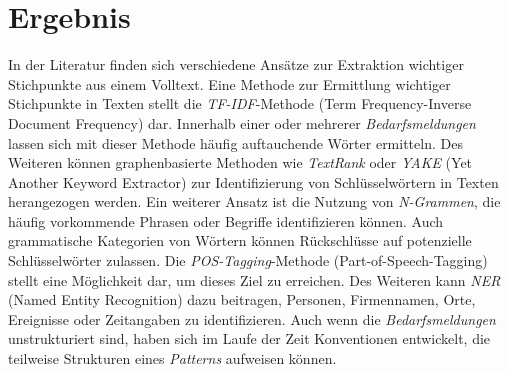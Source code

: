 \section{Ergebnis}
In der Literatur finden sich verschiedene Ansätze zur Extraktion wichtiger Stichpunkte aus einem Volltext. Eine Methode zur Ermittlung wichtiger Stichpunkte in Texten stellt die \emph{TF-IDF}-Methode (Term Frequency-Inverse Document Frequency) dar. Innerhalb einer oder mehrerer \emph{Bedarfsmeldungen} lassen sich mit dieser Methode häufig auftauchende Wörter ermitteln. Des Weiteren können graphenbasierte Methoden wie \emph{TextRank} oder \emph{YAKE} (Yet Another Keyword Extractor) zur Identifizierung von Schlüsselwörtern in Texten herangezogen werden. Ein weiterer Ansatz ist die Nutzung von \emph{N-Grammen}, die häufig vorkommende Phrasen oder Begriffe identifizieren können. Auch grammatische Kategorien von Wörtern können Rückschlüsse auf potenzielle Schlüsselwörter zulassen. Die \emph{POS-Tagging}-Methode (Part-of-Speech-Tagging) stellt eine Möglichkeit dar, um dieses Ziel zu erreichen. Des Weiteren kann \emph{NER} (Named Entity Recognition) dazu beitragen, Personen, Firmennamen, Orte, Ereignisse oder Zeitangaben zu identifizieren. Auch wenn die \emph{Bedarfsmeldungen} unstrukturiert sind, haben sich im Laufe der Zeit Konventionen entwickelt, die teilweise Strukturen eines \emph{Patterns} aufweisen können.




\newpage





